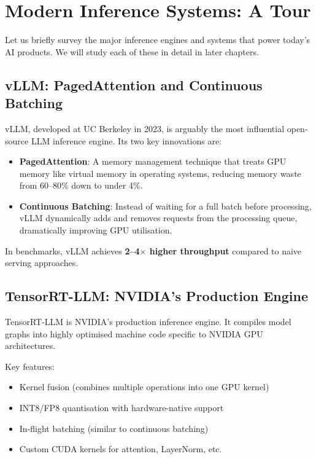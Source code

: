 \documentclass[12pt, twoside, openright]{book}
\newcommand{\term}[1]{\textbf{\color{chaptercolor}#1}}
\begin{document}
\section{Modern Inference Systems: A Tour}

Let us briefly survey the major inference engines and systems
that power today's AI products.
We will study each of these in detail in later chapters.

\subsection{vLLM: PagedAttention and Continuous Batching}

vLLM, developed at UC Berkeley in 2023, is arguably the most
influential open-source LLM inference engine.
Its two key innovations are:

\begin{itemize}
  \item \term{PagedAttention}: A memory management technique that
        treats GPU memory like virtual memory in operating systems,
        reducing memory waste from 60--80\% down to under 4\%.
  \item \term{Continuous Batching}: Instead of waiting for a full
        batch before processing, vLLM dynamically adds and removes
        requests from the processing queue, dramatically improving GPU
        utilisation.
\end{itemize}

In benchmarks, vLLM achieves \textbf{2--4$\times$ higher throughput}
compared to naive serving approaches.

\subsection{TensorRT-LLM: NVIDIA's Production Engine}

TensorRT-LLM is NVIDIA's production inference engine.
It compiles model graphs into highly optimised machine code specific
to NVIDIA GPU architectures.

Key features:
\begin{itemize}
  \item Kernel fusion (combines multiple operations into one GPU kernel)
  \item INT8/FP8 quantisation with hardware-native support
  \item In-flight batching (similar to continuous batching)
  \item Custom CUDA kernels for attention, LayerNorm, etc.
\end{itemize}
\end{document}
